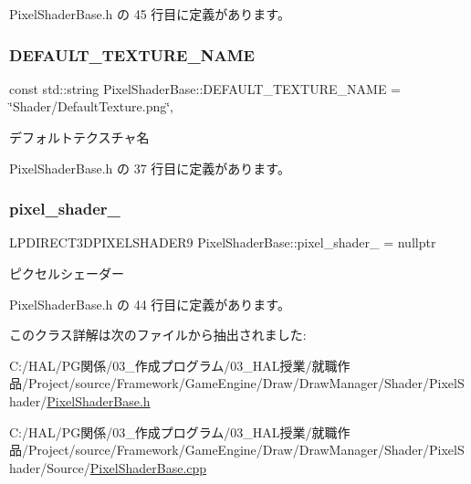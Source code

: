  Pixel\+Shader\+Base.\+h の 45 行目に定義があります。

\mbox{\label{class_pixel_shader_base_a34ef5095d790635c1a0d71d5d8a5863c}} 
\subsubsection{\texorpdfstring{D\+E\+F\+A\+U\+L\+T\+\_\+\+T\+E\+X\+T\+U\+R\+E\+\_\+\+N\+A\+ME}{DEFAULT\_TEXTURE\_NAME}}
{\footnotesize\ttfamily const std\+::string Pixel\+Shader\+Base\+::\+D\+E\+F\+A\+U\+L\+T\+\_\+\+T\+E\+X\+T\+U\+R\+E\+\_\+\+N\+A\+ME = \char`\"{}Shader/Default\+Texture.\+png\char`\"{}\hspace{0.3cm}{\ttfamily [static]}, {\ttfamily [private]}}



デフォルトテクスチャ名 



 Pixel\+Shader\+Base.\+h の 37 行目に定義があります。

\mbox{\label{class_pixel_shader_base_a5d7213c21268dc57ef82d37a64ff942f}} 
\subsubsection{\texorpdfstring{pixel\+\_\+shader\+\_\+}{pixel\_shader\_}}
{\footnotesize\ttfamily L\+P\+D\+I\+R\+E\+C\+T3\+D\+P\+I\+X\+E\+L\+S\+H\+A\+D\+E\+R9 Pixel\+Shader\+Base\+::pixel\+\_\+shader\+\_\+ = nullptr\hspace{0.3cm}{\ttfamily [private]}}



ピクセルシェーダー 



 Pixel\+Shader\+Base.\+h の 44 行目に定義があります。



このクラス詳解は次のファイルから抽出されました\+:\begin{DoxyCompactItemize}
\item 
C\+:/\+H\+A\+L/\+P\+G関係/03\+\_\+作成プログラム/03\+\_\+\+H\+A\+L授業/就職作品/\+Project/source/\+Framework/\+Game\+Engine/\+Draw/\+Draw\+Manager/\+Shader/\+Pixel\+Shader/\mbox{\hyperlink{_pixel_shader_base_8h}{Pixel\+Shader\+Base.\+h}}\item 
C\+:/\+H\+A\+L/\+P\+G関係/03\+\_\+作成プログラム/03\+\_\+\+H\+A\+L授業/就職作品/\+Project/source/\+Framework/\+Game\+Engine/\+Draw/\+Draw\+Manager/\+Shader/\+Pixel\+Shader/\+Source/\mbox{\hyperlink{_pixel_shader_base_8cpp}{Pixel\+Shader\+Base.\+cpp}}\end{DoxyCompactItemize}
